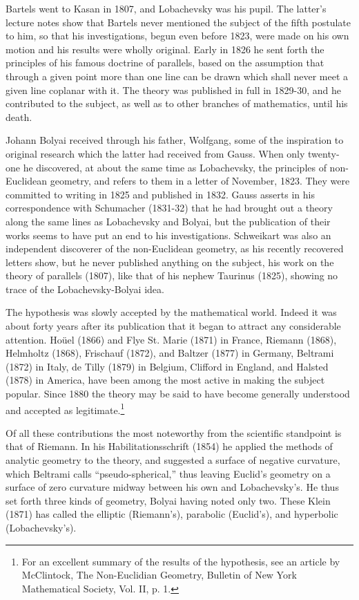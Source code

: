 \documentclass[oneside]{book}
\begin{document}
Bartels went to Kasan in 1807, and Lobachevsky was his pupil. The
latter's lecture notes show that Bartels never mentioned the subject
of the fifth postulate to him, so that his investigations, begun
even before 1823, were made on his own motion and his results were
wholly original. Early in 1826 he sent forth the principles of his
famous doctrine of parallels, based on the assumption that through a
given point more than one line can be drawn which shall never meet a
given line coplanar with it. The theory was published in full in
1829-30, and he contributed to the subject, as well as to other
branches of mathematics, until his death.

Johann Bolyai received through his father, Wolfgang, some of the
inspiration to original research which the latter had received from
Gauss. When only twenty-one he discovered, at about the same time as
Lobachevsky, the principles of non-Euclidean geometry, and refers to
them in a letter of November, 1823. They were committed to writing
in 1825 and published in 1832. Gauss asserts in his correspondence
with Schumacher (1831-32) that he had brought out a theory along the
same lines as Lobachevsky and Bolyai, but the publication of their
works seems to have put an end to his investigations. Schweikart
was also an independent discoverer of the non-Euclidean geometry, as
his recently recovered letters show, but he never published anything
on the subject, his work on the theory of parallels (1807), like
that of his nephew Taurinus (1825), showing no trace of the
Lobachevsky-Bolyai idea.

The hypothesis was slowly accepted by the mathematical world. Indeed
it was about forty years after its publication that it began to
attract any considerable attention. Ho\"uel (1866) and Flye
St. Marie (1871) in France, Riemann (1868), Helmholtz (1868),
Frischauf (1872), and Baltzer (1877) in Germany, Beltrami (1872) in
Italy, de Tilly (1879) in Belgium, Clifford in England, and Halsted
(1878) in America, have been among the most active in making the
subject popular. Since 1880 the theory may be said to have become
generally understood and accepted as legitimate.\footnote{For an
excellent summary of the results of the hypothesis, see an article
by McClintock, The Non-Euclidian Geometry, Bulletin of New York
Mathematical Society, Vol. II, p. 1.}

Of all these contributions the most noteworthy from the scientific
standpoint is that of Riemann. In his Habilitationsschrift (1854)
he applied the methods of analytic geometry to the theory, and
suggested a surface of negative curvature, which Beltrami calls
``pseudo-spherical,'' thus leaving Euclid's geometry on a surface of
zero curvature midway between his own and Lobachevsky's. He thus set
forth three kinds of geometry, Bolyai having noted only two. These
Klein (1871) has called the elliptic (Riemann's), parabolic
(Euclid's), and hyperbolic (Lobachevsky's).
\end{document}
